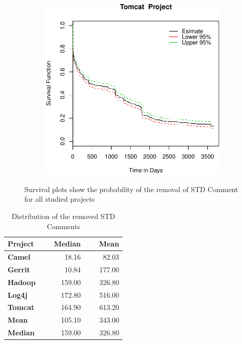\begin{figure}[t]
\begin{subfigure}[b]{0.195\textwidth}
		\label{fig:removal_comparison_log4j_survival}
	\end{subfigure}
	\begin{subfigure}[b]{0.195\textwidth}
		\includegraphics[width=\textwidth]{figures/Survival/tomcat.pdf}
		\label{fig:removal_comparison_hadoop_survival} 
	\end{subfigure}
	\caption{Survival plots show the probability of the removal of STD Comment for all studied projects}
\end{figure}
\begin{table}[t]
	\centering
	\caption{Distribution of the removed STD Comments}
	\label{tab:Distribution_of_the_removed_STD_Comments}
	\begin{tabular}{@{}l|rrrr@{}}
		\toprule
		\textbf{Project} &~&\textbf{Median} &~& \textbf{Mean} \\ \midrule
		\textbf{Camel} &~& 18.16 &~& 82.03 \\
		\textbf{Gerrit} &~& 10.84 &~& 177.00 \\
		\textbf{Hadoop} &~& 159.00 &~& 326.80 \\
		\textbf{Log4j} &~& 172.80 &~& 516.00 \\
		\textbf{Tomcat} &~& 164.90 &~& 613.20 \\			
		\midrule
		
		\textbf{Mean} &~& 105.10 &~&343.00 \\
		
		\textbf{Median} &~& 159.00 &~& 326.80 \\ \bottomrule
	\end{tabular}
\end{table}
